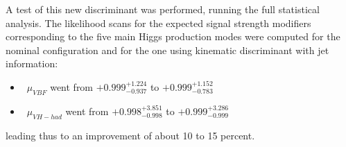A test of this new discriminant was performed, running the full statistical analysis. The likelihood scans for the expected signal strength modifiers corresponding to the five main Higgs production modes were computed for the nominal configuration and for the one using kinematic discriminant with jet information:
\begin{itemize}
\item~$\mu_{VBF}$ went from $+0.999^{+1.224}_{-0.937}$ to  $+0.999^{+1.152}_{-0.783}$
\item~$\mu_{VH-had}$ went from $+0.998^{+3.851}_{-0.998}$ to  $+0.999^{+3.286}_{-0.999}$
\end{itemize}

leading thus to an improvement of about 10 to 15 percent. 



